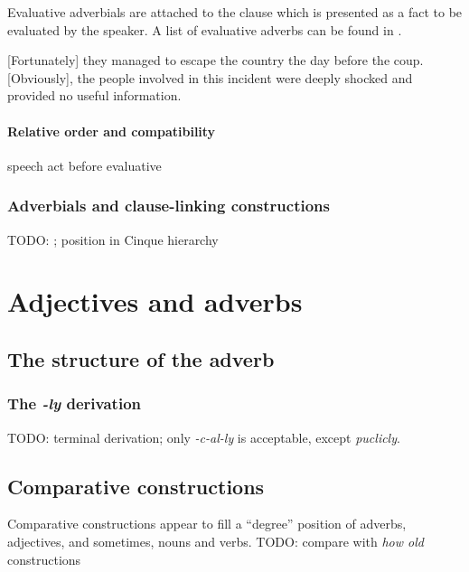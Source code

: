 \documentclass[UTF8, a4paper, oneside, scheme=plain, 12pt]{ctexbook}
\newcommand*{\citesec}[1]{\S~{#1}}
\newcommand*{\citechap}[1]{Ch~{#1}}
\newcommand*{\citepage}[1]{p.~{#1}}
\newcommand{\form}[1]{\emph{#1}}
\begin{document}
Evaluative adverbials are attached to the clause 
which is presented as a fact to be evaluated by the speaker.
A list of evaluative adverbs can be found in \citet[\citepage{771}, {[2]}]{cgel}.

\begin{exe}
    \ex {} [Fortunately] they managed to escape the country the day before the coup.
    \ex {} [Obviously], the people involved in this incident were deeply shocked and 
    provided no useful information.
\end{exe}

\subsubsection{Relative order and compatibility}

speech act before evaluative \citep[\citepage{106}]{cinque1999adverbs}

\subsection{Adverbials and clause-linking constructions}

TODO: \citet[\citechap{8}, \citesec{12}]{cgel}; position in Cinque hierarchy

\chapter{Adjectives and adverbs}

\section{The structure of the adverb}

\subsection{The \form{-ly} derivation}

TODO: terminal derivation; only \form{-c-al-ly} is acceptable,
except \form{puclicly}.

\section{Comparative constructions}

Comparative constructions appear to fill a ``degree'' position
of adverbs, adjectives, and sometimes, nouns and verbs.
TODO: compare with \form{how old} constructions  
\end{document}
